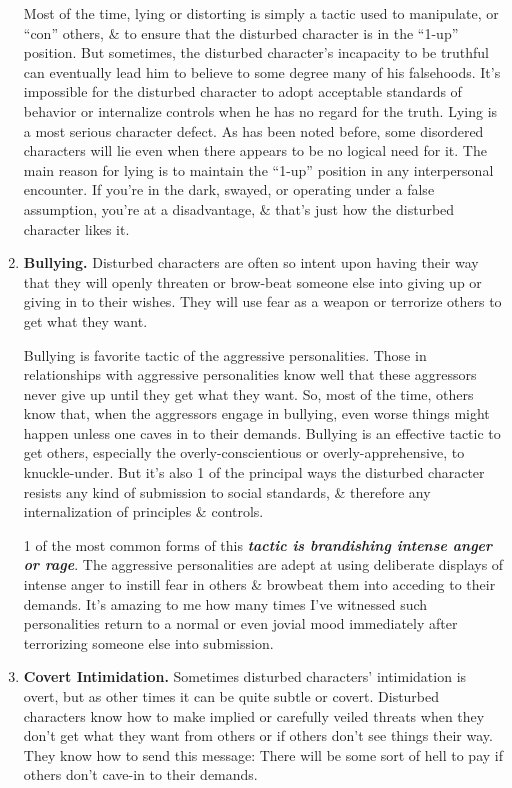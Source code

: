 \documentclass{article}
\numberwithin{equation}{section}
\begin{document}
\begin{enumerate}
	Most of the time, lying or distorting is simply a tactic used to manipulate, or ``con'' others, \& to ensure that the disturbed character is in the ``1-up'' position. But sometimes, the disturbed character's incapacity to be truthful can eventually lead him to believe to some degree many of his falsehoods. It's impossible for the disturbed character to adopt acceptable standards of behavior or internalize controls when he has no regard for the truth. Lying is a most serious character defect. As has been noted before, some disordered characters will lie even when there appears to be no logical need for it. The main reason for lying is to maintain the ``1-up'' position in any interpersonal encounter. If you're in the dark, swayed, or operating under a false assumption, you're at a disadvantage, \& that's just how the disturbed character likes it.
	\item \textbf{Bullying.} Disturbed characters are often so intent upon having their way that they will openly threaten or brow-beat someone else into giving up or giving in to their wishes. They will use fear as a weapon or terrorize others to get what they want.
	
	Bullying is favorite tactic of the aggressive personalities. Those in relationships with aggressive personalities know well that these aggressors never give up until they get what they want. So, most of the time, others know that, when the aggressors engage in bullying, even worse things might happen unless one caves in to their demands. Bullying is an effective tactic to get others, especially the overly-conscientious or overly-apprehensive, to knuckle-under. But it's also 1 of the principal ways the disturbed character resists any kind of submission to social standards, \& therefore any internalization of principles \& controls.
	
	1 of the most common forms of this \textbf{\textit{tactic is brandishing intense anger or rage}}. The aggressive personalities are adept at using deliberate displays of intense anger to instill fear in others \& browbeat them into acceding to their demands. It's amazing to me how many times I've witnessed such personalities return to a normal or even jovial mood immediately after terrorizing someone else into submission.
	\item \textbf{Covert Intimidation.} Sometimes disturbed characters' intimidation is overt, but as other times it can be quite subtle or covert. Disturbed characters know how to make implied or carefully veiled threats when they don't get what they want from others or if others don't see things their way. They know how to send this message: There will be some sort of hell to pay if others don't cave-in to their demands.
	

\end{enumerate}
\end{document}
